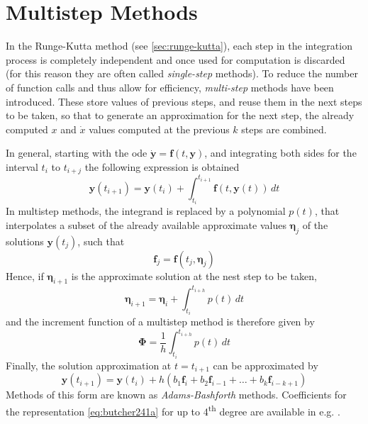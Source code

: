 \section{Multistep Methods}\label{sec:multistep-methods}


In the Runge-Kutta method (see \autoref{sec:runge-kutta}), each step in the 
integration process is completely independent and once used for computation is 
discarded (for this reason they are often called \emph{single-step} methods). 
To reduce the number of function calls and thus allow for efficiency, \emph{multi-step} 
methods have been introduced. These store values of previous steps, and reuse them 
in the next steps to be taken, so that to generate an approximation for the next 
step, the already computed $x$ and $\dot{x}$ values computed at the previous $k$ 
steps are combined.

In general, starting with the \gls{ode} $\bm{\dot{y}} = \bm{f}(t,\bm{y})$, and 
integrating both sides for the interval $t_i$ to $t_{i+j}$ the following expression 
is obtained
\begin{equation}\label{eq:mont442}
    \bm{y}(t_{i+1}) = \bm{y}(t_i) + \int_{t_i}^{t_{i+1}} \bm{f}(t,\bm{y}(t)) \,dt
\end{equation}
In multistep methods, the integrand is replaced by a polynomial $p(t)$, that interpolates 
a subset of the already available approximate values $\bm{\eta}_j$ of the solutions 
$\bm{y}(t_j)$, such that
\begin{equation}
    \bm{f}_j = \bm{f}(t_j, \bm{\eta}_j)
\end{equation}
Hence, if $\bm{\eta}_{i+1}$ is the approximate solution at the nest step to be taken, 
\begin{equation}
    \bm{\eta}_{i+1} = \bm{\eta}_i + \int_{t_i}^{t_{i+h}} p(t) \,dt
\end{equation}
and the increment function of a multistep method is therefore given by
\begin{equation}
    \bm{\Phi} = \frac{1}{h} \int_{t_i}^{t_{i+h}} p(t) \,dt
\end{equation}
Finally, the solution approximation at $t=t_{i+1}$ can be approximated by
\begin{equation}\label{eq:butcher241a}
    \bm{y}(t_{i+1}) = \bm{y}(t_i) + h \left( b_1 \bm{f}_i + b_2 \bm{f}_{i-1} + \dots + b_k \bm{f}_{i-k+1} \right)
\end{equation}
Methods of this form are known as \emph{Adams-Bashforth} methods. Coefficients for 
the representation \autoref{eq:butcher241a} for up to 4\textsuperscript{th} degree 
are available in e.g. \cite{Butcher2016}.